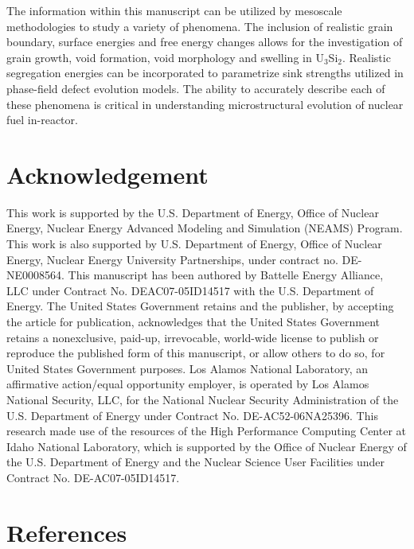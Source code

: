 \documentclass[review]{elsarticle}
\begin{document}
The information within this manuscript can be utilized by mesoscale methodologies to study a variety of phenomena. The inclusion of realistic grain boundary, surface energies and free energy changes allows for the investigation of grain growth, void formation, void morphology and swelling in U$_{3}$Si$_{2}$. Realistic segregation energies can be incorporated to parametrize sink strengths utilized in phase-field defect evolution models. The ability to accurately describe each of these phenomena is critical in understanding microstructural evolution of nuclear fuel in-reactor. 

\section{Acknowledgement}
This work is supported by the U.S. Department of Energy, Office of Nuclear Energy, Nuclear Energy Advanced Modeling and Simulation (NEAMS) Program. This work is also supported by U.S. Department of Energy, Office of Nuclear Energy, Nuclear Energy University Partnerships, under contract no. DE-NE0008564. This manuscript has been authored by Battelle Energy Alliance, LLC under Contract No. DEAC07-05ID14517 with the U.S. Department of Energy. The United States Government retains and the publisher, by accepting the article for publication, acknowledges that the United States Government retains a nonexclusive, paid-up, irrevocable, world-wide license to publish or reproduce the published form of this manuscript, or allow others to do so, for United States Government purposes. Los Alamos National Laboratory, an affirmative action/equal opportunity employer, is operated by Los Alamos National Security, LLC, for the National Nuclear Security Administration of the U.S. Department of Energy under Contract No. DE-AC52-06NA25396. This research made use of the resources of the High Performance Computing Center at Idaho National Laboratory, which is supported by the Office of Nuclear Energy of the U.S. Department of Energy and the Nuclear Science User Facilities under Contract No. DE-AC07-05ID14517.

\section{References}


\end{document}
